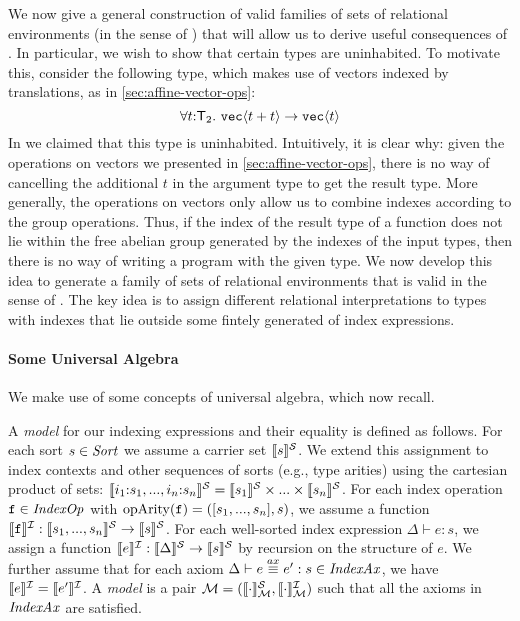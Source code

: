 We now give a general construction of valid families of sets of
relational environments (in the sense of
) that will allow us to derive
useful consequences of . In particular, we
wish to show that certain types are uninhabited. To motivate this,
consider the following type, which makes use of vectors indexed by
translations, as in \autoref{sec:affine-vector-ops}:
\begin{displaymath}
  \forall t\mathord:\SynTransl{2}.\ \tyPrim{vec}{t + t} \to \tyPrim{vec}{t}
\end{displaymath}
In  we claimed that this type is
uninhabited. Intuitively, it is clear why: given the operations on
vectors we presented in \autoref{sec:affine-vector-ops}, there is no
way of cancelling the additional $t$ in the argument type to get the
result type. More generally, the operations on vectors only allow us
to combine indexes according to the group operations. Thus, if the
index of the result type of a function does not lie within the free
abelian group generated by the indexes of the input types, then there
is no way of writing a program with the given type. We now develop
this idea to generate a family of sets of relational environments that
is valid in the sense of . The key
idea is to assign different relational interpretations to types with
indexes that lie outside some fintely generated of index expressions.

\paragraph{Some Universal Algebra}
We make use of some concepts of universal algebra, which now recall.

A \emph{model} for our indexing expressions and their equality is
defined as follows. For each sort $s \in \mathit{Sort}$ we assume a carrier
set $\llbracket s \rrbracket^{\mathcal{S}}$. We extend this assignment to index contexts and
other sequences of sorts (e.g., type arities) using the cartesian
product of sets: $\llbracket i_1\mathord:s_1,...,i_n\mathord:s_n \rrbracket^{\mathcal{S}} =
\llbracket s_1 \rrbracket^{\mathcal{S}} \times ... \times \llbracket s_n \rrbracket^{\mathcal{S}}$. For each index
operation $\texttt{f} \in \mathit{IndexOp}$ with $\mathrm{opArity}(\texttt{f})
= ([s_1,...,s_n],s)$, we assume a function $\llbracket \texttt{f} \rrbracket^{\mathcal{I}} :
\llbracket s_1,...,s_n \rrbracket^{\mathcal{S}} \to \llbracket s \rrbracket^{\mathcal{S}}$. For each well-sorted index
expression $\Delta \vdash e : s$, we assign a function
$\llbracket e \rrbracket^{\mathcal{I}} : \llbracket \Delta \rrbracket^{\mathcal{S}} \to \llbracket s \rrbracket^{\mathcal{S}}$ by recursion on
the structure of $e$. We further assume that for each axiom $\Delta
\vdash e \stackrel{ax}\equiv e' : s \in \mathit{IndexAx}$, we have
$\llbracket e \rrbracket^{\mathcal{I}} = \llbracket e' \rrbracket^{\mathcal{I}}$. A \emph{model} is a pair
$\mathcal{M} = (\llbracket \cdot \rrbracket^{\mathcal{S}}_{\mathcal{M}},
\llbracket \cdot \rrbracket^{\mathcal{I}}_{\mathcal{M}})$ such that all the axioms in
$\mathit{IndexAx}$ are satisfied.

